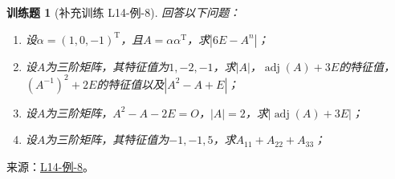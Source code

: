\documentclass[12pt,fontset=fandol]{ctexart}
\newtheorem{exercise}{训练题}[section]
\begin{document}
\begin{exercise}[补充训练 L14-例-8]\label{prob:L14-例-8}
回答以下问题：
    \begin{enumerate}
        \item 设$\alpha=(1,0,-1)^\mathrm{T}$，且$A=\alpha\alpha^\mathrm{T}$，求$|6E-A^n|$；

        \item 设$A$为三阶矩阵，其特征值为$1,-2,-1$，求$|A|$，$\operatorname{adj}(A)+3E$的特征值，$(A^{-1})^2+2E$的特征值以及$|A^2-A+E|$；

        \item 设$A$为三阶矩阵，$A^2-A-2E=O$，$|A|=2$，求$|\operatorname{adj}(A)+3E|$；

        \item 设$A$为三阶矩阵，其特征值为$-1,-1,5$，求$A_{11}+A_{22}+A_{33}$；
    \end{enumerate}
\end{exercise}
\noindent 来源：\href{https://github.com/yhwu-is/Linear-Algebra-Left-Undone/blob/new/%E8%AE%B2%E4%B9%89/%E4%B8%93%E9%A2%98/14%20%E7%9B%B8%E4%BC%BC%E6%A0%87%E5%87%86%E5%BD%A2%EF%BC%9A%E5%8A%A8%E6%9C%BA%E4%B8%8E%E5%9F%BA%E7%A1%80.tex}{L14-例-8}。
\end{document}
